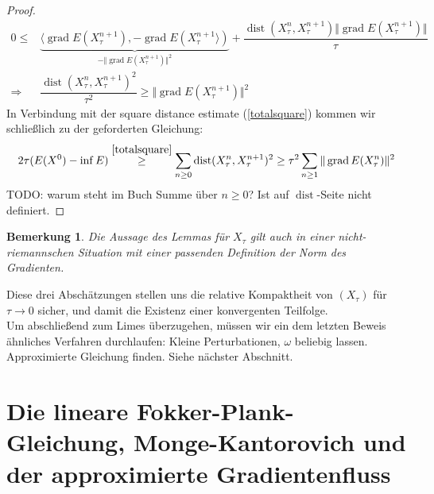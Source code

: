 \documentclass[11pt,a4paper,notitlepage]{scrreprt}
\newcommand{\dist}{\operatorname{dist}}
\newcommand{\grad}{\operatorname{grad}}
\newtheorem{bem}[defi]{Bemerkung}
\begin{document}
\begin{proof}
\begin{align*}
0\leq& \underset{-\Vert \grad E(X_\tau^{n+1}) \Vert^2}{\underbrace{\langle \grad E(X_\tau^{n+1}),-\grad E(X_\tau^{n+1}\rangle)}}+\dfrac{\dist(X_\tau^n,X_\tau^{n+1})\Vert \grad E(X_\tau^{n+1}) \Vert}{\tau}\\
\Rightarrow& \dfrac{\dist(X_\tau^n,X_\tau^{n+1})^2}{\tau^2} \geq \Vert \grad E(X_\tau^{n+1}) \Vert^2
\end{align*}
In Verbindung mit der square distance estimate (\ref{totalsquare}) kommen wir schließlich zu der geforderten Gleichung:
\begin{equation}
 2\tau (E(X^0)-\inf E)\overset{\ref{totalsquare}}\geq \sum_{n\geq 0} \dist(X_\tau^n,X_\tau^{n+1})^2 \geq \tau^2 \sum_{n\geq 1} \Vert \grad E(X_\tau^n)\Vert^2
\end{equation}
TODO: warum steht im Buch Summe über $n\geq 0$? Ist auf $\dist$-Seite nicht definiert.
\end{proof}
\begin{bem}
Die Aussage des Lemmas für $X_\tau$ gilt auch in einer nicht-riemannschen Situation mit einer passenden Definition der Norm des Gradienten. 
\end{bem}

Diese drei Abschätzungen stellen uns die relative Kompaktheit von $(X_\tau)$ für $\tau \to 0$ sicher, und damit die Existenz einer konvergenten Teilfolge.  \\
Um abschließend zum Limes überzugehen, müssen wir ein dem letzten Beweis ähnliches Verfahren durchlaufen: Kleine Perturbationen, $\omega$ beliebig lassen. Approximierte Gleichung finden. Siehe nächster Abschnitt. 

\newpage
\section{Die lineare Fokker-Plank-Gleichung, Monge-Kantorovich und der approximierte Gradientenfluss}
\end{document}
